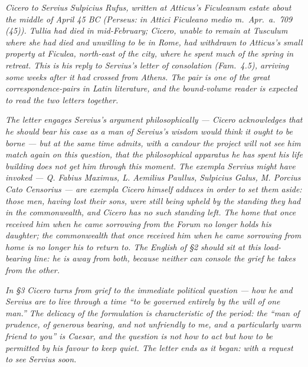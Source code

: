 
\textit{Cicero to Servius Sulpicius Rufus, written at Atticus's
Ficuleanum estate about the middle of April 45 BC (Perseus:
\textit{in Attici Ficuleano medio m.~Apr.~a.~709 (45)}). Tullia
had died in mid-February; Cicero, unable to remain at Tusculum
where she had died and unwilling to be in Rome, had withdrawn to
Atticus's small property at Ficulea, north-east of the city,
where he spent much of the spring in retreat. This is his reply
to Servius's letter of consolation (\textit{Fam.}~4.5), arriving
some weeks after it had crossed from Athens. The pair is one of
the great correspondence-pairs in Latin literature, and the
bound-volume reader is expected to read the two letters together.}

\textit{The letter engages Servius's argument philosophically ---
Cicero acknowledges that he should bear his case as a man of
Servius's wisdom would think it ought to be borne --- but at the
same time admits, with a candour the project will not see him
match again on this question, that the philosophical apparatus he
has spent his life building does not get him through this moment.
The exempla Servius might have invoked --- Q. Fabius Maximus,
L. Aemilius Paullus, Sulpicius Galus, M. Porcius Cato Censorius
--- are exempla Cicero himself adduces in order to set them
aside: those men, having lost their sons, were still being upheld
by the standing they had in the commonwealth, and Cicero has no
such standing left. The home that once received him when he came
sorrowing from the Forum no longer holds his daughter; the
commonwealth that once received him when he came sorrowing from
home is no longer his to return to. The English of \S 2 should
sit at this load-bearing line: he is away from both, because
neither can console the grief he takes from the other.}

\textit{In \S 3 Cicero turns from grief to the immediate
political question --- how he and Servius are to live through a
time ``to be governed entirely by the will of one man.'' The
delicacy of the formulation is characteristic of the period: the
``man of prudence, of generous bearing, and not unfriendly to me,
and a particularly warm friend to you'' is Caesar, and the
question is not how to act but how to be permitted by his favour
to keep quiet. The letter ends as it began: with a request to
see Servius soon.}
